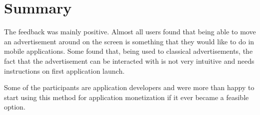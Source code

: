 \section{Summary}

The feedback was mainly positive. Almost all users found that being able to move an advertisement around on the screen is something that they would like to do in mobile applications. Some found that, being used to classical advertisements, the fact that the advertisement can be interacted with is not very intuitive and needs instructions on first application launch.

Some of the participants are application developers and were more than happy to start using this method for application monetization if it ever became a feasible option.

